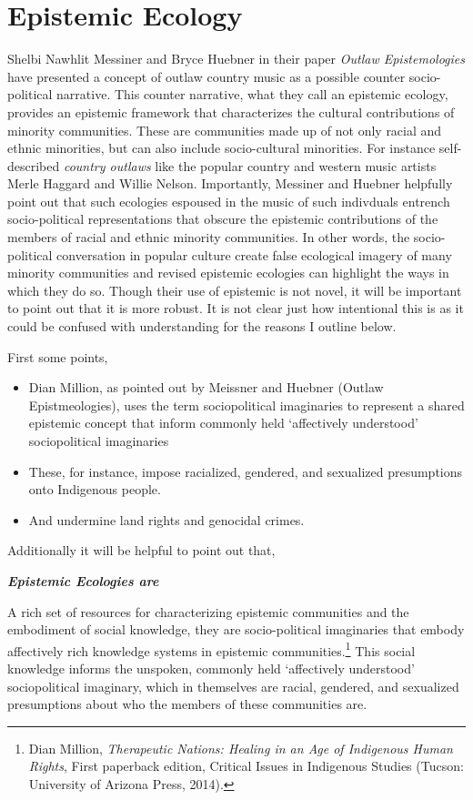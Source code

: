 \documentclass[phdthesis,12pt,final,a4paper]{wuthesis}
\theoremstyle{definition}
\theoremstyle{definition}
\theoremstyle{definition}
\theoremstyle{definition}
\theoremstyle{remark}
\begin{document}
\section{Epistemic Ecology}\label{epistemic-ecology}

Shelbi Nawhlit Messiner and Bryce Huebner in their paper \emph{Outlaw Epistemologies} have presented a concept of outlaw country music as a possible counter socio-political narrative. This counter narrative, what they call an epistemic ecology, provides an epistemic framework that characterizes the cultural contributions of minority communities. These are communities made up of not only racial and ethnic minorities, but can also include socio-cultural minorities. For instance self-described \emph{country outlaws} like the popular country and western music artists Merle Haggard and Willie Nelson. Importantly, Messiner and Huebner helpfully point out that such ecologies espoused in the music of such indivduals entrench socio-political representations that obscure the epistemic contributions of the members of racial and ethnic minority communities. In other words, the socio-political conversation in popular culture create false ecological imagery of many minority communities and revised epistemic ecologies can highlight the ways in which they do so. Though their use of epistemic is not novel, it will be important to point out that it is more robust. It is not clear just how intentional this is as it could be confused with understanding for the reasons I outline below.

First some points,

\begin{itemize}
\tightlist
\item
  Dian Million, as pointed out by Meissner and Huebner (Outlaw Epistmeologies), uses the term sociopolitical imaginaries to represent a shared epistemic concept that inform commonly held `affectively understood' sociopolitical imaginaries
\item
  These, for instance, impose racialized, gendered, and sexualized presumptions onto Indigenous people.
\item
  And undermine land rights and genocidal crimes.
\end{itemize}

Additionally it will be helpful to point out that,

\textbf{\emph{Epistemic Ecologies are}}

A rich set of resources for characterizing epistemic communities and the embodiment of social knowledge, they are socio-political imaginaries that embody affectively rich knowledge systems in epistemic communities.\footnote{Dian Million, \emph{Therapeutic {Nations}: {Healing} in an {Age} of {Indigenous Human Rights}}, First paperback edition, Critical {Issues} in {Indigenous Studies} (Tucson: University of Arizona Press, 2014).} This social knowledge informs the unspoken, commonly held `affectively understood' sociopolitical imaginary, which in themselves are racial, gendered, and sexualized presumptions about who the members of these communities are.
\end{document}
